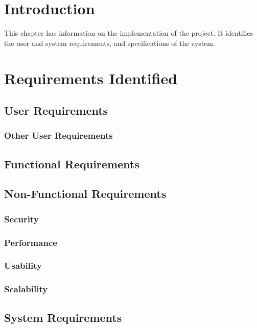 \section{Introduction}
This chapter has information on the implementation of the project. It identifies the user and system requirements, and specifications of the system.

\section{Requirements Identified}


\subsection{User Requirements}

\subsubsection{Other User Requirements}


\subsection{Functional Requirements}


\subsection{Non-Functional Requirements}

\subsubsection{Security}


\subsubsection{Performance}


\subsubsection{Usability}


\subsubsection{Scalability}


\subsection{System Requirements}


